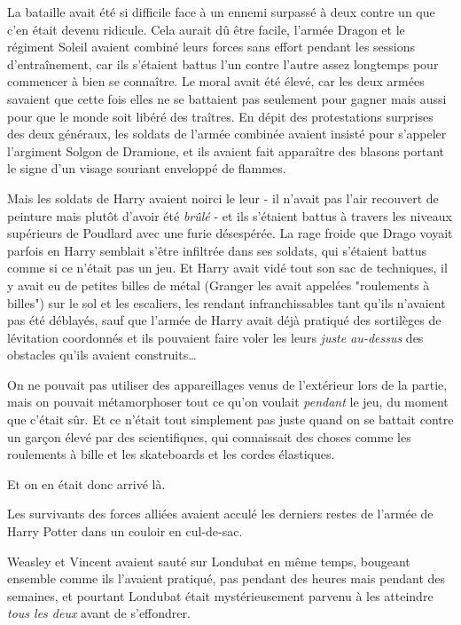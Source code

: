 La bataille avait été si difficile face à un ennemi surpassé à deux contre un que c'en était devenu ridicule. Cela aurait dû être facile, l'armée Dragon et le régiment Soleil avaient combiné leurs forces sans effort pendant les sessions d'entraînement, car ils s'étaient battus l'un contre l'autre assez longtemps pour commencer à bien se connaître. Le moral avait été élevé, car les deux armées savaient que cette fois elles ne se battaient pas seulement pour gagner mais aussi pour que le monde soit libéré des traîtres. En dépit des protestations surprises des deux généraux, les soldats de l'armée combinée avaient insisté pour s'appeler l'argiment Solgon de Dramione, et ils avaient fait apparaître des blasons portant le signe d'un visage souriant enveloppé de flammes.

Mais les soldats de Harry avaient noirci le leur - il n'avait pas l'air recouvert de peinture mais plutôt d'avoir été \emph{brûlé} - et ils s'étaient battus à travers les niveaux supérieurs de Poudlard avec une furie désespérée. La rage froide que Drago voyait parfois en Harry semblait s'être infiltrée dans ses soldats, qui s'étaient battus comme si ce n'était pas un jeu. Et Harry avait vidé tout son sac de techniques, il y avait eu de petites billes de métal (Granger les avait appelées "roulements à billes") sur le sol et les escaliers, les rendant infranchissables tant qu'ils n'avaient pas été déblayés, sauf que l'armée de Harry avait déjà pratiqué des sortilèges de lévitation coordonnés et ils pouvaient faire voler les leurs \emph{juste au-dessus} des obstacles qu'ils avaient construits…

On ne pouvait pas utiliser des appareillages venus de l'extérieur lors de la partie, mais on pouvait métamorphoser tout ce qu'on voulait \emph{pendant} le jeu, du moment que c'était sûr. Et ce n'était tout simplement pas juste quand on se battait contre un garçon élevé par des scientifiques, qui connaissait des choses comme les roulements à bille et les skateboards et les cordes élastiques.

Et on en était donc arrivé là.

Les survivants des forces alliées avaient acculé les derniers restes de l'armée de Harry Potter dans un couloir en cul-de-sac.

Weasley et Vincent avaient sauté sur Londubat en même temps, bougeant ensemble comme ils l'avaient pratiqué, pas pendant des heures mais pendant des semaines, et pourtant Londubat était mystérieusement parvenu à les atteindre \emph{tous les deux} avant de s'effondrer.

